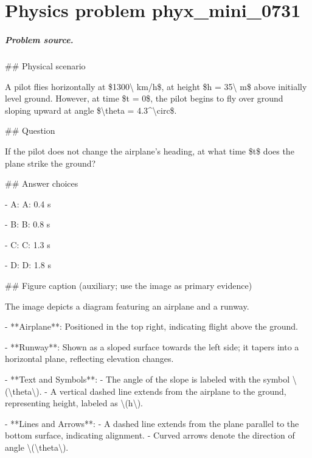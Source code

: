 
\chapter{Physics problem phyx\_mini\_0731}
\label{ch:PhyXMiniProblems_problem_phyx_mini_0731}

\paragraph{Problem source.}
\#\# Physical scenario

A pilot flies horizontally at \$1300\textbackslash{} km/h\$, at height \$h = 35\textbackslash{} m\$ above initially level ground. However, at time \$t = 0\$, the pilot begins to fly over ground sloping upward at angle \$\textbackslash{}theta = 4.3\textasciicircum{}\textbackslash{}circ\$.

\#\# Question

If the pilot does not change the airplane's heading, at what time \$t\$ does the plane strike the ground?

\#\# Answer choices

- A: A: 0.4 s

- B: B: 0.8 s

- C: C: 1.3 s

- D: D: 1.8 s

\#\# Figure caption (auxiliary; use the image as primary evidence)

The image depicts a diagram featuring an airplane and a runway. 

- **Airplane**: Positioned in the top right, indicating flight above the ground.

- **Runway**: Shown as a sloped surface towards the left side; it tapers into a horizontal plane, reflecting elevation changes.

- **Text and Symbols**:
  - The angle of the slope is labeled with the symbol \textbackslash{}(\textbackslash{}theta\textbackslash{}).
  - A vertical dashed line extends from the airplane to the ground, representing height, labeled as \textbackslash{}(h\textbackslash{}).

- **Lines and Arrows**:
  - A dashed line extends from the plane parallel to the bottom surface, indicating alignment.
  - Curved arrows denote the direction of angle \textbackslash{}(\textbackslash{}theta\textbackslash{}).

